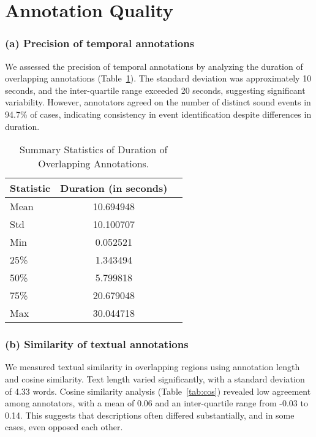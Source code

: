 \documentclass{article}
\begin{document}
\maketitle


\section{Annotation Quality}

\subsubsection{(a) Precision of temporal annotations}
We assessed the precision of temporal annotations by analyzing the duration of overlapping annotations (Table~\ref{tab:dur}). The standard deviation was approximately 10 seconds, and the inter-quartile range exceeded 20 seconds, suggesting significant variability.
However, annotators agreed on the number of distinct sound events in 94.7\% of cases, indicating consistency in event identification despite differences in duration. 

\begin{table}[h]
    \caption{Summary Statistics of Duration of Overlapping Annotations.}
    \label{tab:dur}
    \centering
    \begin{tabular}{lcl}
        \toprule
        Statistic & Duration (in seconds) \\ \midrule
        Mean            & 10.694948 \\
        Std             & 10.100707 \\
        Min             & 0.052521 \\
        25\%            & 1.343494 \\
        50\%            & 5.799818 \\
        75\%            & 20.679048 \\ 
        Max             & 30.044718 \\ \bottomrule
    \end{tabular}
\end{table}


\subsubsection{(b) Similarity of textual annotations}
We measured textual similarity in overlapping regions using annotation length and cosine similarity. Text length varied significantly, with a standard deviation of 4.33 words.
Cosine similarity analysis (Table~\ref{tab:cos}) revealed low agreement among annotators, with a mean of 0.06 and an inter-quartile range from -0.03 to 0.14. This suggests that descriptions often differed substantially, and in some cases, even opposed each other.  
\end{document}
